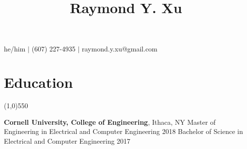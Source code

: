 \documentclass[11pt]{article} %
\title{\vspace{-6ex} \Huge Raymond Y. Xu \vspace{-4ex}}
\author{}
\date{} %
\begin{document}
	\maketitle
	\vspace{-4ex}
	\begin{center}
		he/him $|$ (607) 227-4935 $|$ raymond.y.xu@gmail.com \\
		 \vspace{-3ex}
	\end{center}
	\section*{Education}
	\vspace{-7ex}
	\begin{center}
    \line(1,0){550}
    \end{center}
    \vspace{0ex}
    {\large\textbf{Cornell University, College of Engineering}}, Ithaca, NY \newline
	Master of Engineering in Electrical and Computer Engineering \hfill 2018\newline
	Bachelor of Science in Electrical and Computer Engineering%
	\hfill 2017\newline
	\vspace{-4ex}
\end{document}
